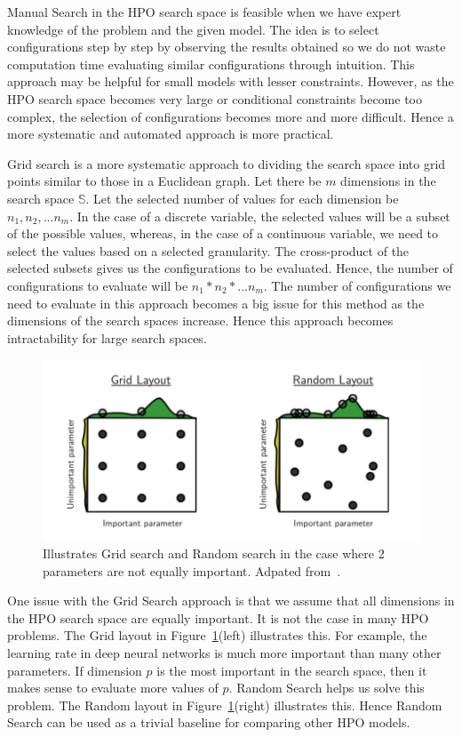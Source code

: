 \documentclass[12pt, twoside, ngerman]{report}
\begin{document}
Manual Search in the HPO search space is feasible when we have expert knowledge of the problem and the given model. 
The idea is to select configurations step by step by observing the results obtained so we do not waste computation time evaluating similar configurations through intuition.
This approach may be helpful for small models with lesser constraints.
However, as the HPO search space becomes very large or conditional constraints become too complex, the selection of configurations becomes more and more difficult.
Hence a more systematic and automated approach is more practical.

Grid search is a more systematic approach to dividing the search space into grid points similar to those in a Euclidean graph.
Let there be $m$ dimensions in the search space $\mathbb{S}$. Let the selected number of values for each dimension be $n_1, n_2, ... n_m$. In the case of a discrete variable, the selected values will be a subset of the possible values, whereas, in the case of a continuous variable, we need to select the values based on a selected granularity.
The cross-product of the selected subsets gives us the configurations to be evaluated. Hence, the number of configurations to evaluate will be $n_1 * n_2 * ... n_m$.
The number of configurations we need to evaluate in this approach becomes a big issue for this method as the dimensions of the search spaces increase.
Hence this approach becomes intractability for large search spaces.

\begin{figure}[htb]
  \centering
    \includegraphics[scale=0.8]{images/rsgsexample}
    \caption{Illustrates Grid search and Random search in the case where 2 parameters are not equally important.  Adpated from~\cite{rshpoarticle}.}
    \label{fig:rshpofig}
\end{figure}

One issue with the Grid Search approach is that we assume that all dimensions in the HPO search space are equally important. It is not the case in many HPO problems. The Grid layout in Figure~\ref{fig:rshpofig}(left) illustrates this. For example, the learning rate in deep neural networks is much more important than many other parameters. If dimension $p$ is the most important in the search space, then it makes sense to evaluate more values of $p$. Random Search helps us solve this problem. 
The Random layout in Figure~\ref{fig:rshpofig}(right) illustrates this. 
Hence Random Search can be used as a trivial baseline for comparing other HPO models.
\end{document}

